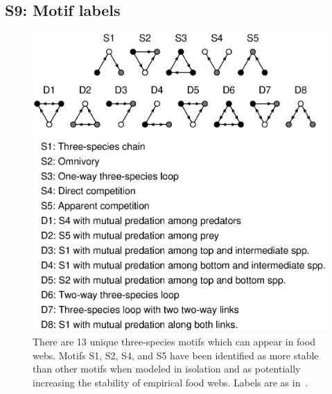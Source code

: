 \documentclass[12pt]{article}
\begin{document}
\begin{spacing}{2.0}


\section*{S9: Motif labels}

	\begin{figure}[h!]
		\caption{There are 13 unique three-species motifs which can appear in food webs. Motifs S1, S2, S4, and S5 have been identified as more stable than other motifs when modeled in isolation and as potentially increasing the stability of empirical food webs. Labels are as in~\citet{Stouffer2007}.}
		\label{motifs}
		\includegraphics[width=.8\textwidth]{figures/motifs.eps}
		\end{figure}

\end{spacing}
\clearpage

     
\end{document}
